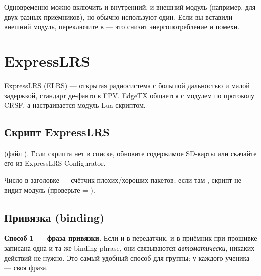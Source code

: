 \begin{note}
Одновременно можно включить и внутренний, и внешний модуль (например, для двух разных
приёмников), но обычно используют один. Если вы вставили внешний модуль, переключите
 в  --- это снизит энергопотребление и помехи.
\end{note}

\section{ExpressLRS}

ExpressLRS (ELRS) --- открытая радиосистема с большой дальностью и малой задержкой, стандарт
де-факто в FPV. EdgeTX общается с модулем по протоколу CRSF, а настраивается модуль
Lua-скриптом.

\subsection{Скрипт ExpressLRS}

 (файл ). Если скрипта нет
в списке, обновите содержимое SD-карты или скачайте его из ExpressLRS Configurator.

\begin{center}
\end{center}

Число  в заголовке --- счётчик плохих/хороших пакетов; если там \code{--},
скрипт не видит модуль (проверьте  = ).

\subsection{Привязка (binding)}

\textbf{Способ 1 --- фраза привязки.} Если и в передатчик, и в приёмник при прошивке
записана одна и та же binding phrase, они связываются \emph{автоматически}, никаких действий
не нужно. Это самый удобный способ для группы: у каждого ученика --- своя фраза.


